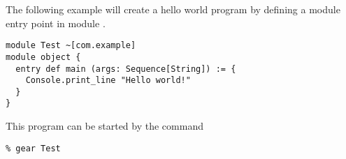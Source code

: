 \example The following example will create a hello world program by defining a module entry point in module . 

\syntax\begin{lstlisting}[morekeywords={entry}]
module Test ~[com.example]
module object {
  entry def main (args: Sequence[String]) := {
    Console.print_line "Hello world!"
  }
}
\end{lstlisting}

This program can be started by the command
\begin{lstlisting}
% gear Test
\end{lstlisting}








